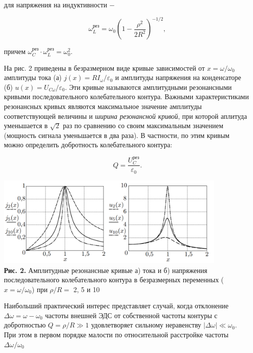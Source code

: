 \documentclass[a4paper,12pt]{article} %
\begin{document}
\hfill \break для напряжения на индуктивности $-$

\begin{equation}\label{ linkname }
\omega_{L}^{\text{рез}} = \omega_{0} \left( 1-\frac{\rho^2}{2R^2} \right) ^{-1/2},
\end{equation}

\hfill \break причем $\omega_{C}^{\text{рез}} \cdot \omega_{L}^{\text{рез}} = \omega_{0}^2$. 

\hfill \break На рис. 2 приведены в безразмерном виде кривые зависимостей от $x = \omega/\omega_{0}$ амплитуды тока (а) $j(x) = RI_{\omega}/\varepsilon_{0}$ и амплитуды напряжения на конденсаторе (б) $u(x) = U_{C\omega}/\varepsilon_{0}$. Эти кривые называются амплитудными резонансными кривыми последовательного колебательного контура. Важными характеристиками резонансных кривых являются максимальное значение амплитуды соответствующей величины и \textit{ширина резонансной кривой}, при которой аплитуда уменьшается в $\sqrt{2}$ раз по сравнению со своим максимальным значением (мощность сигнала уменьшается в два раза). В частности, по этим кривым можно определить добротность колебательного контура:

\begin{equation}\label{ linkname }
Q = \frac{U_{C}^{\text{рез}}}{\varepsilon_{0}}.
\end{equation}

\begin{center}
\includegraphics[width=0.85\textwidth]{3.2.2_2.png}\\
\textbf{Рис. 2.}  Амплитудные резонансные кривые а) тока и б) напряжения последовательного колебательного контура в безразмерных переменных ($x = \omega/\omega_{0}$) при $\rho/R =$ 2, 5 и 10\\ 
\end{center}

\hfill \break Наибольший практический интерес представляет случай, когда отклонение $\Delta \omega = \omega - \omega_{0}$ частоты внешней ЭДС от собственной частоты контуры с добротностью $Q = \rho/R \gg 1$ удовлетворяет сильному неравенству $|\Delta \omega| \ll \omega_{0}$. При этом в первом порядке малости по относительной расстройке частоты $\Delta \omega/\omega_{0}$
\end{document}
